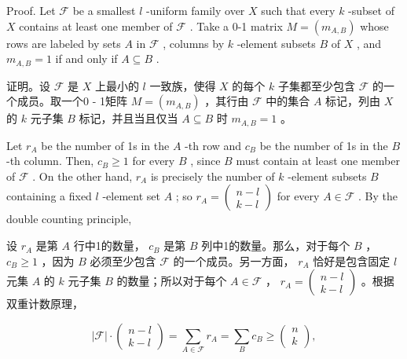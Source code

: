 \documentclass[10pt]{article}
\begin{document}
Proof. Let \(\mathcal{F}\) be a smallest \(l\) -uniform family over \(X\) such that every \(k\) -subset of \(X\) contains at least one member of \(\mathcal{F}\) . Take a 0-1 matrix \(M = \left( {m}_{A,B}\right)\) whose rows are labeled by sets \(A\) in \(\mathcal{F}\) , columns by \(k\) -element subsets \(B\) of \(X\) , and \({m}_{A,B} = 1\) if and only if \(A \subseteq  B\) .

\begin{tcolorbox}\relax
证明。设 \(\mathcal{F}\) 是 \(X\) 上最小的 \(l\) 一致族，使得 \(X\) 的每个 \(k\) 子集都至少包含 \(\mathcal{F}\) 的一个成员。取一个0 - 1矩阵 \(M = \left( {m}_{A,B}\right)\) ，其行由 \(\mathcal{F}\) 中的集合 \(A\) 标记，列由 \(X\) 的 \(k\) 元子集 \(B\) 标记，并且当且仅当 \(A \subseteq  B\) 时 \({m}_{A,B} = 1\) 。
\end{tcolorbox}

Let \({r}_{A}\) be the number of 1s in the \(A\) -th row and \({c}_{B}\) be the number of 1s in the \(B\) -th column. Then, \({c}_{B} \geq  1\) for every \(B\) , since \(B\) must contain at least one member of \(\mathcal{F}\) . On the other hand, \({r}_{A}\) is precisely the number of \(k\) -element subsets \(B\) containing a fixed \(l\) -element set \(A\) ; so \({r}_{A} = \left( \begin{matrix} n - l \\  k - l \end{matrix}\right)\) for every \(A \in  \mathcal{F}\) . By the double counting principle,

\begin{tcolorbox}\relax
设 \({r}_{A}\) 是第 \(A\) 行中1的数量， \({c}_{B}\) 是第 \(B\) 列中1的数量。那么，对于每个 \(B\) ， \({c}_{B} \geq  1\) ，因为 \(B\) 必须至少包含 \(\mathcal{F}\) 的一个成员。另一方面， \({r}_{A}\) 恰好是包含固定 \(l\) 元集 \(A\) 的 \(k\) 元子集 \(B\) 的数量；所以对于每个 \(A \in  \mathcal{F}\) ， \({r}_{A} = \left( \begin{matrix} n - l \\  k - l \end{matrix}\right)\) 。根据双重计数原理，
\end{tcolorbox}

\[
\left| \mathcal{F}\right|  \cdot  \left( \begin{array}{l} n - l \\  k - l \end{array}\right)  = \mathop{\sum }\limits_{{A \in  \mathcal{F}}}{r}_{A} = \mathop{\sum }\limits_{B}{c}_{B} \geq  \left( \begin{array}{l} n \\  k \end{array}\right) ,
\]
\end{document}
